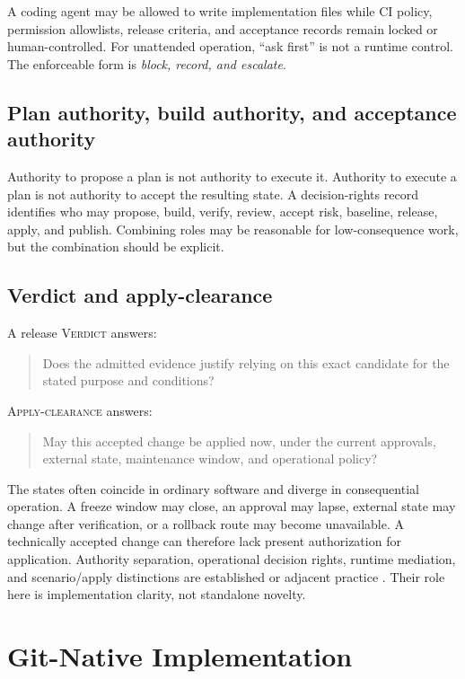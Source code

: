 \documentclass[11pt]{article}
\newcommand{\verdict}{\textsc{Verdict}}
\newcommand{\applyclearance}{\textsc{Apply-clearance}}
\begin{document}
A coding agent may be allowed to write implementation files while CI policy, permission allowlists, release criteria, and acceptance records remain locked or human-controlled. For unattended operation, ``ask first'' is not a runtime control. The enforceable form is \emph{block, record, and escalate}.

\subsection{Plan authority, build authority, and acceptance authority}

Authority to propose a plan is not authority to execute it. Authority to execute a plan is not authority to accept the resulting state. A decision-rights record identifies who may propose, build, verify, review, accept risk, baseline, release, apply, and publish. Combining roles may be reasonable for low-consequence work, but the combination should be explicit.

\subsection{Verdict and apply-clearance}

A release \verdict{} answers:

\begin{quote}
Does the admitted evidence justify relying on this exact candidate for the stated purpose and conditions?
\end{quote}

\applyclearance{} answers:

\begin{quote}
May this accepted change be applied now, under the current approvals, external state, maintenance window, and operational policy?
\end{quote}

The states often coincide in ordinary software and diverge in consequential operation. A freeze window may close, an approval may lapse, external state may change after verification, or a rollback route may become unavailable. A technically accepted change can therefore lack present authorization for application. Authority separation, operational decision rights, runtime mediation, and scenario/apply distinctions are established or adjacent practice \citep{nasa2024models,doe2016cm,kawas2026decision,kaul2026agentbound,palantir2026scenarios}. Their role here is implementation clarity, not standalone novelty.

\section{Git-Native Implementation}
\label{sec:implementation}
\end{document}
